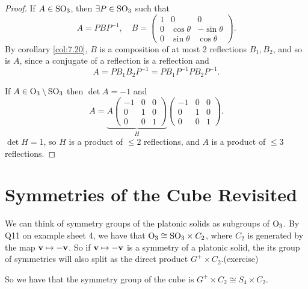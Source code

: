 \documentclass[10pt]{article}
\def\le{\leqslant}
\begin{document}
    \begin{proof}
        If $A\in \mathrm{SO}_3$, then $ \exists P\in \mathrm{SO}_3 $ such that 
        \[
            A=PBP^{-1}, \quad B=\begin{pmatrix}
                1&0&0\\
                0&\cos \theta& -\sin \theta\\
                0&\sin \theta& \cos \theta
            \end{pmatrix}.
        \]
        By corollary \ref{col:7.20}, $B$ is a composition of at most 2 reflections $B_1,B_2$, and so is $A$, since a conjugate of a reflection is a reflection and 
        \[
            A=PB_1B_2P^{-1} = PB_1P^{-1}PB_2P^{-1}.
        \]

        If $ A\in \mathrm{O}_3 \setminus \mathrm{SO}_3 $ then $ \det A=-1 $ and 
        \[
            A=\underbrace{A\begin{pmatrix}
                -1&0&0\\
                0&1&0\\
                0&0&1
            \end{pmatrix}}_{H}\begin{pmatrix}
                -1&0&0\\
                0&1&0\\
                0&0&1
            \end{pmatrix}.
        \]
        $ \det H=1 $, so $H$ is a product of $\le 2$ reflections, and $A$ is a product of $\le 3$ reflections.

    \end{proof}
    \section{Symmetries of the Cube Revisited}
    We can think of symmetry groups of the platonic solids as subgroups of $\mathrm{O}_3$. By Q11 on example sheet 4, we have that $ \mathrm{O}_3 \cong \mathrm{SO}_3 \times C_2 $, where $C_2$ is generated by the map $ {\bf v} \mapsto -{\bf v} $. So if $ {\bf v} \mapsto -{\bf v} $ is a symmetry of a platonic solid, the its group of symmetries will also split as the direct product $ G^+ \times C_2 $.(exercise)
    
    So we have that the symmetry group of the cube is $ G^+\times C_2 \cong S_4 \times C_2 $.
\end{document}
